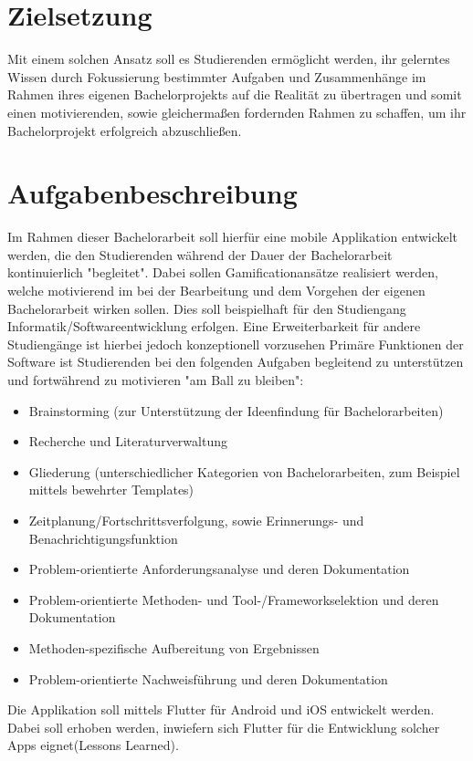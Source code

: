 \documentclass{scrreprt}
\begin{document}
\section{Zielsetzung}
Mit einem solchen Ansatz soll es Studierenden ermöglicht werden, ihr gelerntes Wissen durch Fokussierung bestimmter Aufgaben und Zusammenhänge im Rahmen ihres eigenen Bachelorprojekts auf die Realität zu übertragen und somit einen motivierenden, sowie gleichermaßen fordernden Rahmen zu schaffen, um ihr Bachelorprojekt erfolgreich abzuschließen.

\section{Aufgabenbeschreibung}
Im Rahmen dieser Bachelorarbeit soll hierfür eine mobile Applikation entwickelt werden, die den Studierenden während der Dauer der Bachelorarbeit kontinuierlich "begleitet". Dabei sollen Gamificationansätze realisiert werden, welche motivierend im bei der Bearbeitung und dem Vorgehen der eigenen Bachelorarbeit wirken sollen. Dies soll beispielhaft für den Studiengang Informatik/Softwareentwicklung erfolgen. Eine Erweiterbarkeit für andere Studiengänge ist hierbei jedoch konzeptionell vorzusehen
Primäre Funktionen der Software ist Studierenden bei den folgenden Aufgaben begleitend zu unterstützen und fortwährend zu motivieren "am Ball zu bleiben":
\begin{itemize}
\item Brainstorming (zur Unterstützung der Ideenfindung für Bachelorarbeiten)
\item Recherche und Literaturverwaltung
\item Gliederung (unterschiedlicher Kategorien von Bachelorarbeiten, zum Beispiel mittels bewehrter Templates)
\item Zeitplanung/Fortschrittsverfolgung, sowie Erinnerungs- und Benachrichtigungsfunktion 
\item Problem-orientierte Anforderungsanalyse und deren Dokumentation
\item Problem-orientierte Methoden- und Tool-/Frameworkselektion und deren Dokumentation
\item Methoden-spezifische Aufbereitung von Ergebnissen
\item Problem-orientierte Nachweisführung und deren Dokumentation
\end{itemize}
Die Applikation soll mittels Flutter für Android und iOS entwickelt werden. Dabei soll erhoben werden, inwiefern sich Flutter für die Entwicklung solcher Apps eignet(Lessons Learned). 
\end{document}
